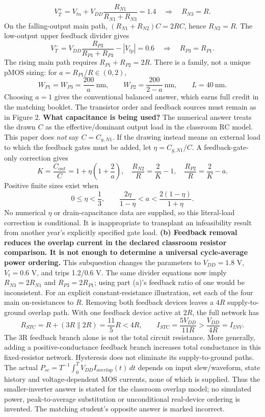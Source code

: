 \documentclass[10pt]{article}
\begin{document}
\[V_T^+=V_{tn}+V_{DD}\frac{R_{N1}}{R_{N1}+R_{N3}}=1.4\quad\Longrightarrow\quad R_{N3}=R.\]
On the falling-output main path, $(R_{N1}+R_{N2})C=2RC$, hence $R_{N2}=R$. The low-output upper feedback divider gives
\[V_T^-=V_{DD}\frac{R_{P3}}{R_{P1}+R_{P3}}-|V_{tp}|=0.6\quad\Longrightarrow\quad R_{P3}=R_{P1}.\]
The rising main path requires $R_{P1}+R_{P2}=2R$. There is a family, not a unique pMOS sizing: for $a=R_{P1}/R\in(0,2)$,
\[W_{P1}=W_{P3}=\frac{200}{a}\ \mathrm{nm},\qquad W_{P2}=\frac{200}{2-a}\ \mathrm{nm},\qquad L=40\ \mathrm{nm}.\]
Choosing $a=1$ gives the conventional balanced answer, which earns full credit in the matching booklet. The transistor order and feedback sources must remain as in Figure 2.
\textbf{What capacitance is being used?} The numerical answer treats the drawn $C$ as the effective/dominant output load in the classroom RC model. This paper does \emph{not} say $C=C_{g,N1}$. If the drawing instead means an external load to which the feedback gates must be added, let $\eta=C_{g,N1}/C$. A feedback-gate-only correction gives
\[K=\frac{C_{out}}C=1+\eta\left(1+\frac2a\right),\quad\frac{R_{N2}}R=\frac2K-1,\quad\frac{R_{P2}}R=\frac2K-a.\]
Positive finite sizes exist when
\[0\le\eta<\frac13,\qquad \frac{2\eta}{1-\eta}<a<\frac{2(1-\eta)}{1+\eta}.\]
No numerical $\eta$ or drain-capacitance data are supplied, so this literal-load correction is conditional. It is inappropriate to transplant an infeasibility result from another year's explicitly specified gate load.
\newpage
\textbf{(b) Feedback removal reduces the overlap current in the declared classroom resistor comparison. It is not enough to determine a universal cycle-average power ordering.}
This subquestion changes the parameters to $V_{DD}=1.8$ V, $V_t=0.6$ V, and trips 1.2/0.6 V. The same divider equations now imply $R_{N3}=2R_{N1}$ and $R_{P3}=2R_{P1}$; using part (a)'s feedback ratio of one would be inconsistent.
For an explicit constant-resistance illustration, set each of the four main on-resistances to $R$. Removing both feedback devices leaves a $4R$ supply-to-ground overlap path. With one feedback device active at $2R$, the full network has
\[R_{STC}=R+(3R\parallel2R)=\frac{11}{5}R<4R,\qquad I_{STC}=\frac{5V_{DD}}{11R}>\frac{V_{DD}}{4R}=I_{INV}.\]
The 3R feedback branch alone is not the total circuit resistance. More generally, adding a positive-conductance feedback branch increases total conductance in this fixed-resistor network. Hysteresis does not eliminate its supply-to-ground paths.
The actual $P_{sc}=T^{-1}\int_0^T V_{DD}I_{overlap}(t)\,dt$ depends on input slew/waveform, state history and voltage-dependent MOS currents, none of which is supplied. Thus the smaller-inverter answer is stated for the classroom overlap model; no simulated power, peak-to-average substitution or unconditional real-device ordering is invented. The matching student's opposite answer is marked incorrect.
\end{document}
